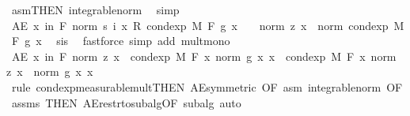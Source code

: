 \begin{isabellebody}
\ asm{\isacharparenleft}{\kern0pt}{}{\isacharparenright}{\kern0pt}{\isacharbrackleft}{\kern0pt}THEN\ integrable{\isacharunderscore}{\kern0pt}norm{\isacharbrackright}{\kern0pt}\ \isamarkupfalse%
\ simp\isanewline
\ \ \ \ \ \ \ \ \isamarkupfalse%
\ {\isachardoublequoteopen}AE\ x\ in\ {\isacharquery}{\kern0pt}F{\isachardot}{\kern0pt}\ norm\ {\isacharparenleft}{\kern0pt}s\ i\ x\ {\isacharasterisk}{\kern0pt}\isactrlsub R\ cond{\isacharunderscore}{\kern0pt}exp\ M\ F\ g\ x{\isacharparenright}{\kern0pt}\ {\isasymle}\ {}\ {\isacharasterisk}{\kern0pt}\ norm\ {\isacharparenleft}{\kern0pt}z\ x{\isacharparenright}{\kern0pt}\ {\isacharasterisk}{\kern0pt}\ norm\ {\isacharparenleft}{\kern0pt}cond{\isacharunderscore}{\kern0pt}exp\ M\ F\ g\ x{\isacharparenright}{\kern0pt}{\isachardoublequoteclose}\ \isamarkupfalse%
\ s{\isacharunderscore}{\kern0pt}is{\isacharparenleft}{\kern0pt}{}{\isacharparenright}{\kern0pt}\ \isamarkupfalse%
\ {\isacharparenleft}{\kern0pt}fastforce\ simp\ add{\isacharcolon}{\kern0pt}\ mult{\isacharunderscore}{\kern0pt}mono{\isacharparenright}{\kern0pt}\isanewline
\ \ \ \ \ \ \ \ \isamarkupfalse%
\ \isamarkupfalse%
\ {\isachardoublequoteopen}AE\ x\ in\ {\isacharquery}{\kern0pt}F{\isachardot}{\kern0pt}\ norm\ {\isacharparenleft}{\kern0pt}z\ x{\isacharparenright}{\kern0pt}\ {\isacharasterisk}{\kern0pt}\ cond{\isacharunderscore}{\kern0pt}exp\ M\ F\ {\isacharparenleft}{\kern0pt}{\isasymlambda}x{\isachardot}{\kern0pt}\ norm\ {\isacharparenleft}{\kern0pt}g\ x{\isacharparenright}{\kern0pt}{\isacharparenright}{\kern0pt}\ x\ {\isacharequal}{\kern0pt}\ cond{\isacharunderscore}{\kern0pt}exp\ M\ F\ {\isacharparenleft}{\kern0pt}{\isasymlambda}x{\isachardot}{\kern0pt}\ norm\ {\isacharparenleft}{\kern0pt}z\ x{\isacharparenright}{\kern0pt}\ {\isacharasterisk}{\kern0pt}\ norm\ {\isacharparenleft}{\kern0pt}g\ x{\isacharparenright}{\kern0pt}{\isacharparenright}{\kern0pt}\ x{\isachardoublequoteclose}\ \isamarkupfalse%
\ {\isacharparenleft}{\kern0pt}rule\ cond{\isacharunderscore}{\kern0pt}exp{\isacharunderscore}{\kern0pt}measurable{\isacharunderscore}{\kern0pt}mult{\isacharparenleft}{\kern0pt}{}{\isacharparenright}{\kern0pt}{\isacharbrackleft}{\kern0pt}THEN\ AE{\isacharunderscore}{\kern0pt}symmetric{\isacharcomma}{\kern0pt}\ OF\ asm\ integrable{\isacharunderscore}{\kern0pt}norm{\isacharcomma}{\kern0pt}\ OF\ assms{\isacharparenleft}{\kern0pt}{}{\isacharparenright}{\kern0pt}{\isacharcomma}{\kern0pt}\ THEN\ AE{\isacharunderscore}{\kern0pt}restr{\isacharunderscore}{\kern0pt}to{\isacharunderscore}{\kern0pt}subalg{}{\isacharbrackleft}{\kern0pt}OF\ subalg{\isacharbrackright}{\kern0pt}{\isacharbrackright}{\kern0pt}{\isacharcomma}{\kern0pt}\ auto{\isacharparenright}{\kern0pt}\isanewline

\end{isabellebody}
